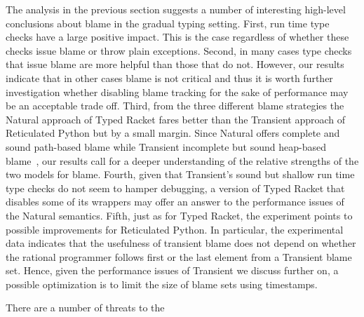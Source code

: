 



The analysis in the previous section suggests a number of interesting
high-level conclusions about blame in the gradual typing setting.  First,
run time type checks have a large positive impact. This is the case
regardless of whether these checks issue blame or throw plain exceptions.
Second, in many cases type checks that issue blame are more helpful than
those that do not. However, our results indicate that in other cases blame
is not critical and thus it is worth further investigation whether
disabling blame tracking for the sake of performance may be   an
acceptable trade off. Third, from the three different blame strategies the
Natural approach of Typed Racket fares better than the Transient approach
of Reticulated Python but by a small margin. Since Natural offers complete
and sound path-based blame while Transient incomplete but sound heap-based
blame~\cite{gfd-oopsla-2019}, our results call for a deeper understanding
of the relative strengths of the two models for blame.  Fourth, given that
Transient's sound but shallow run time type checks do not seem to hamper
debugging, a version of Typed Racket that disables some of its wrappers
may offer an answer to the performance issues of the Natural semantics. 
Fifth, just as for Typed Racket, the experiment points to possible
improvements for Reticulated Python. In particular, the experimental 
data indicates that the usefulness of transient blame does not depend on
whether  the rational programmer follows first or the last element from a
Transient blame set. Hence, given the performance issues of Transient we discuss further on, 
a possible optimization is to limit the size of blame sets
using timestamps.

There are a number of threats to the

